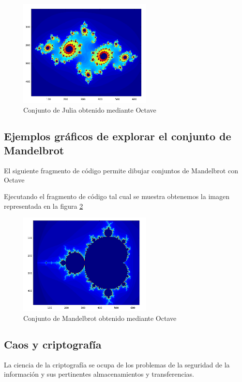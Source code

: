 \begin{figure}[hbtp]
\centering
\includegraphics[width = 0.6\textwidth]{img/JuliaOctave.png}
\caption{Conjunto de Julia obtenido mediante Octave}
\label{fig:JuliaOctave}
\end{figure}

\subsection{Ejemplos gráficos de explorar el conjunto de Mandelbrot}
El siguiente fragmento de código permite dibujar conjuntos de Mandelbrot con Octave



Ejecutando el fragmento de código tal cual se muestra obtenemos la imagen representada en la figura \ref{fig:MandelbrotOctave}
\begin{figure}[hbtp]
\centering
\includegraphics[width = 0.6\textwidth]{img/mandelbrotOctave.png}
\caption{Conjunto de Mandelbrot obtenido mediante Octave}
\label{fig:MandelbrotOctave}
\end{figure}

\subsection{Caos y criptografía}
La ciencia de la criptografía se ocupa de los problemas de la seguridad de la información y sus pertinentes almacenamientos y transferencias.

